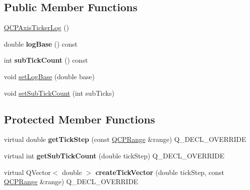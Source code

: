 \subsection*{Public Member Functions}
\begin{DoxyCompactItemize}
\item 
\hyperlink{classQCPAxisTickerLog_af3cb86ea5eef2023c0b96b5260c4cbdf}{Q\+C\+P\+Axis\+Ticker\+Log} ()
\item 
\mbox{\label{classQCPAxisTickerLog_a841a97f2b6850ff1ef3aa73e89d94775}} 
double {\bfseries log\+Base} () const
\item 
\mbox{\label{classQCPAxisTickerLog_aebe43661977364fc1fd220fa1ae36a10}} 
int {\bfseries sub\+Tick\+Count} () const
\item 
void \hyperlink{classQCPAxisTickerLog_ac6e3b4e03baea3816f898869ab9751ef}{set\+Log\+Base} (double base)
\item 
void \hyperlink{classQCPAxisTickerLog_ad51989c798c0cfd50936d77aac57c56a}{set\+Sub\+Tick\+Count} (int sub\+Ticks)
\end{DoxyCompactItemize}
\subsection*{Protected Member Functions}
\begin{DoxyCompactItemize}
\item 
\mbox{\label{classQCPAxisTickerLog_a57be974214a065d3247406331f02fa49}} 
virtual double {\bfseries get\+Tick\+Step} (const \hyperlink{classQCPRange}{Q\+C\+P\+Range} \&range) Q\+\_\+\+D\+E\+C\+L\+\_\+\+O\+V\+E\+R\+R\+I\+DE
\item 
\mbox{\label{classQCPAxisTickerLog_a352fef7ae68837acd26e35188aa86167}} 
virtual int {\bfseries get\+Sub\+Tick\+Count} (double tick\+Step) Q\+\_\+\+D\+E\+C\+L\+\_\+\+O\+V\+E\+R\+R\+I\+DE
\item 
\mbox{\label{classQCPAxisTickerLog_af8873a8d1d2b9392d8f7a73218c889ab}} 
virtual Q\+Vector$<$ double $>$ {\bfseries create\+Tick\+Vector} (double tick\+Step, const \hyperlink{classQCPRange}{Q\+C\+P\+Range} \&range) Q\+\_\+\+D\+E\+C\+L\+\_\+\+O\+V\+E\+R\+R\+I\+DE
\end{DoxyCompactItemize}
